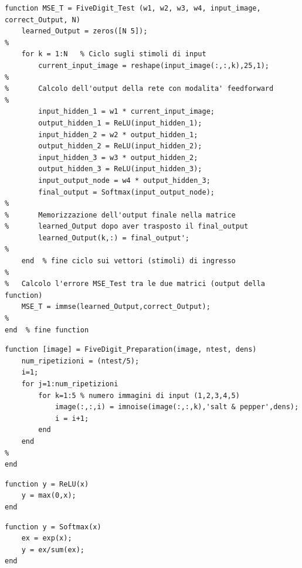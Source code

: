 \documentclass[a4paper,12pt]{article}
\begin{document}
\newpage
\begin{lstlisting}[style=Matlab-editor,title=\texttt{FiveDigit\_Test.mat}]
function MSE_T = FiveDigit_Test (w1, w2, w3, w4, input_image, correct_Output, N)
    learned_Output = zeros([N 5]);
%
    for k = 1:N   % Ciclo sugli stimoli di input
        current_input_image = reshape(input_image(:,:,k),25,1);
%
%       Calcolo dell'output della rete con modalita' feedforward
% 
        input_hidden_1 = w1 * current_input_image;
        output_hidden_1 = ReLU(input_hidden_1);
        input_hidden_2 = w2 * output_hidden_1;
        output_hidden_2 = ReLU(input_hidden_2);
        input_hidden_3 = w3 * output_hidden_2;
        output_hidden_3 = ReLU(input_hidden_3);
        input_output_node = w4 * output_hidden_3;
        final_output = Softmax(input_output_node);
%
%       Memorizzazione dell'output finale nella matrice 
%       learned_Output dopo aver trasposto il final_output
        learned_Output(k,:) = final_output';
%
    end  % fine ciclo sui vettori (stimoli) di ingresso
%
%   Calcolo l'errore MSE_Test tra le due matrici (output della function)
    MSE_T = immse(learned_Output,correct_Output);
%
end  % fine function
\end{lstlisting}


\newpage
\begin{lstlisting}[style=Matlab-editor,caption=\texttt{FiveDigit\_Preparation},title=\texttt{FiveDigit\_Preparation.mat},label=lst:preparation]
function [image] = FiveDigit_Preparation(image, ntest, dens)
    num_ripetizioni = (ntest/5);
    i=1;
    for j=1:num_ripetizioni
        for k=1:5 % numero immagini di input (1,2,3,4,5)
            image(:,:,i) = imnoise(image(:,:,k),'salt & pepper',dens);
            i = i+1;
        end
    end
%
end
\end{lstlisting}


\vspace{1cm}


\begin{lstlisting}[style=Matlab-editor,title=\texttt{ReLU.mat}]
function y = ReLU(x)
    y = max(0,x);
end
\end{lstlisting}


\vspace{1cm}


\begin{lstlisting}[style=Matlab-editor,title=\texttt{Softmax.mat}]
function y = Softmax(x)
    ex = exp(x);
    y = ex/sum(ex);
end
\end{lstlisting}


\newpage
\setcounter{section}{0}
\renewcommand{\thesection}{\alph{section}}
\end{document}
